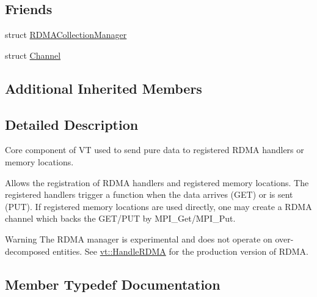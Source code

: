 \subsection*{Friends}
\begin{DoxyCompactItemize}
\item 
struct \hyperlink{structvt_1_1rdma_1_1_r_d_m_a_manager_a59e73ef8c81ddf4094802bfda5ac42cc}{R\+D\+M\+A\+Collection\+Manager}
\item 
struct \hyperlink{structvt_1_1rdma_1_1_r_d_m_a_manager_a5786d652b263a505c6c74f25e7c0994a}{Channel}
\end{DoxyCompactItemize}
\subsection*{Additional Inherited Members}


\subsection{Detailed Description}
Core component of VT used to send pure data to registered R\+D\+MA handlers or memory locations. 

Allows the registration of R\+D\+MA handlers and registered memory locations. The registered handlers trigger a function when the data arrives (G\+ET) or is sent (P\+UT). If registered memory locations are used directly, one may create a R\+D\+MA channel which backs the G\+E\+T/\+P\+UT by M\+P\+I\+\_\+\+Get/\+M\+P\+I\+\_\+\+Put.

\begin{DoxyWarning}{Warning}
The R\+D\+MA manager is experimental and does not operate on over-\/decomposed entities. See {\ttfamily \hyperlink{namespacevt_abc3449a4b87363b942453d0b8cc18a7d}{vt\+::\+Handle\+R\+D\+MA}} for the production version of R\+D\+MA. 
\end{DoxyWarning}


\subsection{Member Typedef Documentation}
\mbox{\label{structvt_1_1rdma_1_1_r_d_m_a_manager_ab2b109454390c41ea74e72a2850edd12}} 
